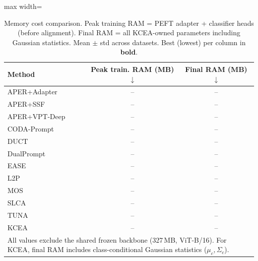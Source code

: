 \begin{table}[!t]
\centering
\caption{Memory cost comparison. Peak training RAM = PEFT adapter + classifier heads (before alignment). Final RAM = all KCEA-owned parameters including Gaussian statistics. Mean $\pm$ std across datasets. Best (lowest) per column in \textbf{bold}.}
\label{tab:cost-memory}
\renewcommand{\arraystretch}{0.95}
\begin{adjustbox}{max width=\textwidth}
\footnotesize
\begin{tabular}{l c c}
\toprule
Method & \textbf{Peak train. RAM (MB)} $\downarrow$ & \textbf{Final RAM (MB)} $\downarrow$ \\
\midrule
APER+Adapter & -- & -- \\
APER+SSF & -- & -- \\
APER+VPT-Deep & -- & -- \\
CODA-Prompt & -- & -- \\
DUCT & -- & -- \\
DualPrompt & -- & -- \\
EASE & -- & -- \\
L2P & -- & -- \\
MOS & -- & -- \\
SLCA & -- & -- \\
TUNA & -- & -- \\
\midrule
KCEA & -- & -- \\
\multicolumn{3}{l}{\scriptsize All values exclude the shared frozen backbone (327\,MB, ViT-B/16). For KCEA, final RAM includes class-conditional Gaussian statistics ($\mu_c, \Sigma_c$).} \\
\bottomrule
\end{tabular}
\end{adjustbox}
\end{table}